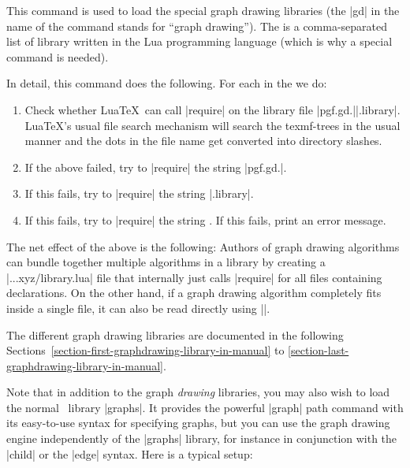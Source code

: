 \begin{command}{\usegdlibrary{}}
  This command is used to load the special graph drawing libraries
  (the |gd| in the name of the command stands for ``graph
  drawing''). The  is a comma-separated list
  of library written in the Lua programming language (which is why a
  special command is needed).

  In detail, this command does the following. For each  in
  the  we do:
  \begin{enumerate}
  \item Check whether Lua\TeX\ can call |require| on the library file
    |pgf.gd.||.library|. Lua\TeX's usual file search 
    mechanism  will search the texmf-trees in the usual manner and the
    dots in the file name get converted into directory slashes.
  \item If the above failed, try to |require| the string
    |pgf.gd.|.
  \item If this fails, try to |require| the string
    |.library|.
  \item If this fails, try to |require| the string . If
    this fails, print an error message.
  \end{enumerate}
  The net effect of the above is the following: Authors of graph
  drawing algorithms can bundle together multiple algorithms in a
  library by creating a |...xyz/library.lua| file that internally just
  calls |require| for all files containing declarations. On the other
  hand, if a graph drawing algorithm completely fits inside a single
  file, it can also be read directly using |\usegdlibrary|.
\begin{codeexample}
\usetikzlibrary{graphdrawing}
\end{codeexample}

  The different graph drawing libraries are documented in the following
  Sections~\ref{section-first-graphdrawing-library-in-manual} to
  \ref{section-last-graphdrawing-library-in-manual}.
\end{command}

Note that in addition to the graph \emph{drawing} libraries, you may
also wish to load the normal \tikzname\ library |graphs|. It provides
the powerful |graph| path command with its easy-to-use syntax for
specifying graphs, but you can use the graph drawing engine
independently of the |graphs| library, for instance in conjunction
with the |child| or the |edge| syntax. Here is a typical setup:

